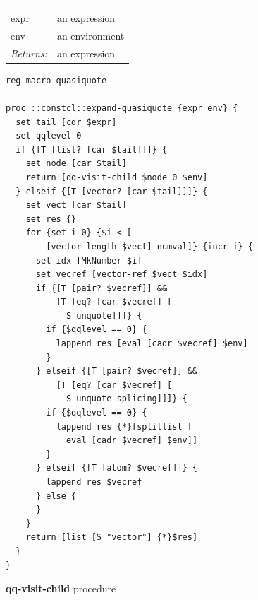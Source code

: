 \documentclass[twoside,9pt]{report}
\begin{document}
\noindent\begin{tabular}{ |p{1.9cm} p{8cm}| }
\hline
\rowcolor[HTML]{CCCCCC} \multicolumn{2}{|l|}{\bf expand-quasiquote (internal)} \\
expr & an expression \\
env & an environment \\
\textit{Returns:} & an expression \\
\hline
\end{tabular}
\begin{lstlisting}
reg macro quasiquote

proc ::constcl::expand-quasiquote {expr env} {
  set tail [cdr $expr]
  set qqlevel 0
  if {[T [list? [car $tail]]]} {
    set node [car $tail]
    return [qq-visit-child $node 0 $env]
  } elseif {[T [vector? [car $tail]]]} {
    set vect [car $tail]
    set res {}
    for {set i 0} {$i < [
        [vector-length $vect] numval]} {incr i} {
      set idx [MkNumber $i]
      set vecref [vector-ref $vect $idx]
      if {[T [pair? $vecref]] &&
          [T [eq? [car $vecref] [
            S unquote]]]} {
        if {$qqlevel == 0} {
          lappend res [eval [cadr $vecref] $env]
        }
      } elseif {[T [pair? $vecref]] &&
          [T [eq? [car $vecref] [
            S unquote-splicing]]]} {
        if {$qqlevel == 0} {
          lappend res {*}[splitlist [
            eval [cadr $vecref] $env]]
        }
      } elseif {[T [atom? $vecref]]} {
        lappend res $vecref
      } else {
      }
    }
    return [list [S "vector"] {*}$res]
  }
}
\end{lstlisting}


\textbf{qq-visit-child} procedure
\end{document}
